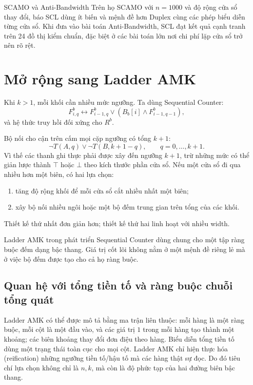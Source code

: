 \begin{resultbox}{SCAMO và Anti-Bandwidth}
Trên họ SCAMO với \(n=1000\) và độ rộng cửa sổ thay đổi,
\textcite{truong2025scamo} báo SCL dùng ít biến và mệnh đề hơn Duplex cùng các
phép biểu diễn từng cửa sổ. Khi đưa vào bài toán Anti-Bandwidth, SCL đạt kết quả
cạnh tranh trên 24 đồ thị kiểm chuẩn, đặc biệt ở các bài toán lớn nơi chi phí
lặp cửa sổ trở nên rõ rệt.
\end{resultbox}

\section{Mở rộng sang Ladder AMK}

Khi \(k>1\), mỗi khối cần nhiều mức ngưỡng. Ta dùng Sequential Counter:
\[
  F^b_{i,q}
  \leftrightarrow
  F^b_{i-1,q}\lor
  (B_b[i]\land F^b_{i-1,q-1}),
\]
và hệ thức truy hồi đối xứng cho \(R^b\).

Bộ nối cho cận trên cấm mọi cặp ngưỡng có tổng \(k+1\):
\[
  \neg T(A,q)
  \lor
  \neg T(B,k+1-q),
  \qquad q=0,\ldots,k+1.
\]
Vì thế các thanh ghi thực phải được xây đến ngưỡng \(k+1\), trừ những mức có
thể giản lược thành \(\top\) hoặc \(\bot\) theo kích thước phần cửa sổ.
Nếu một cửa sổ đi qua nhiều hơn một biên, có hai lựa chọn:
\begin{enumerate}
  \item tăng độ rộng khối để mỗi cửa sổ cắt nhiều nhất một biên;
  \item xây bộ nối nhiều ngôi hoặc một bộ đếm trung gian trên tổng của các khối.
\end{enumerate}
Thiết kế thứ nhất đơn giản hơn; thiết kế thứ hai linh hoạt với nhiều width.

Ladder AMK trong \textcite{truong2026ladderamk} phát triển Sequential Counter dùng
chung cho một tập ràng buộc đếm dạng bậc thang. Giá trị cốt lõi không nằm ở
một mệnh đề riêng lẻ mà ở việc bộ đếm được tạo cho cả họ ràng buộc.

\subsection{Quan hệ với tổng tiền tố và ràng buộc chuỗi tổng quát}

Ladder AMK có thể được mô tả bằng ma trận liên thuộc: mỗi hàng là một ràng
buộc, mỗi cột là một đầu vào, và các giá trị \(1\) trong mỗi hàng tạo thành
một khoảng; các biên khoảng thay đổi đơn điệu theo hàng. Biểu diễn tổng tiền tố
dùng một trạng thái toàn cục cho mọi cột. Ladder AMK chỉ hiện thực hóa (reification) những ngưỡng
tiền tố/hậu tố mà các hàng thật sự đọc. Do đó tiêu chí lựa chọn không chỉ là
\(n,k\), mà còn là độ phức tạp của hai đường biên bậc thang.

